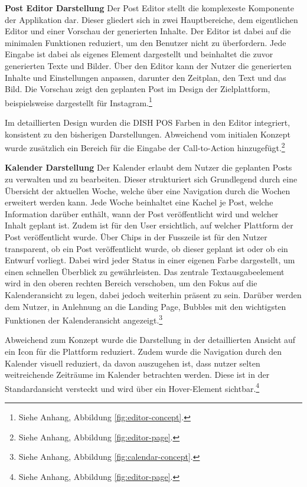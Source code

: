\textbf{Post Editor Darstellung}\newline
Der Post Editor stellt die komplexeste Komponente der Applikation dar.
Dieser gliedert sich in zwei Hauptbereiche, dem eigentlichen Editor und einer Vorschau der generierten Inhalte.
Der Editor ist dabei auf die minimalen Funktionen reduziert, um den Benutzer nicht zu überfordern.
Jede Eingabe ist dabei als eigenes Element dargestellt und beinhaltet die zuvor generierten Texte und Bilder.
Über den Editor kann der Nutzer die generierten Inhalte und Einstellungen anpassen, darunter den Zeitplan, den Text und das Bild.
Die Vorschau zeigt den geplanten Post im Design der Zielplattform, beispielsweise dargestellt für Instagram.\footnote{Siehe Anhang, Abbildung \ref{fig:editor-concept}.}

Im detaillierten Design wurden die DISH POS Farben in den Editor integriert, konsistent zu den bisherigen Darstellungen.
Abweichend vom initialen Konzept wurde zusätzlich ein Bereich für die Eingabe der Call-to-Action hinzugefügt.\footnote{Siehe Anhang, Abbildung \ref{fig:editor-page}.}

\textbf{Kalender Darstellung}\newline
Der Kalender erlaubt dem Nutzer die geplanten Posts zu verwalten und zu bearbeiten.
Dieser strukturiert sich Grundlegend durch eine Übersicht der aktuellen Woche, welche über eine Navigation durch die Wochen erweitert werden kann.
Jede Woche beinhaltet eine Kachel je Post, welche Information darüber enthält, wann der Post veröffentlicht wird und welcher Inhalt geplant ist.
Zudem ist für den User ersichtlich, auf welcher Plattform der Post veröffentlicht wurde.
Über Chips in der Fusszeile ist für den Nutzer transparent, ob ein Post veröffentlicht wurde, ob dieser geplant ist oder ob ein Entwurf vorliegt.
Dabei wird jeder Status in einer eigenen Farbe dargestellt, um einen schnellen Überblick zu gewährleisten.
Das zentrale Textausgabeelement wird in den oberen rechten Bereich verschoben, um den Fokus auf die Kalenderansicht zu legen, dabei jedoch weiterhin präsent zu sein.
Darüber werden dem Nutzer, in Anlehnung an die Landing Page, Bubbles mit den wichtigsten Funktionen der Kalenderansicht angezeigt.\footnote{Siehe Anhang, Abbildung \ref{fig:calendar-concept}.}

Abweichend zum Konzept wurde die Darstellung in der detaillierten Ansicht auf ein Icon für die Plattform reduziert.
Zudem wurde die Navigation durch den Kalender visuell reduziert, da davon auszugehen ist, dass nutzer selten weitreichende Zeiträume im Kalender betrachten werden.
Diese ist in der Standardansicht versteckt und wird über ein Hover-Element sichtbar.\footnote{Siehe Anhang, Abbildung \ref{fig:editor-page}.}

